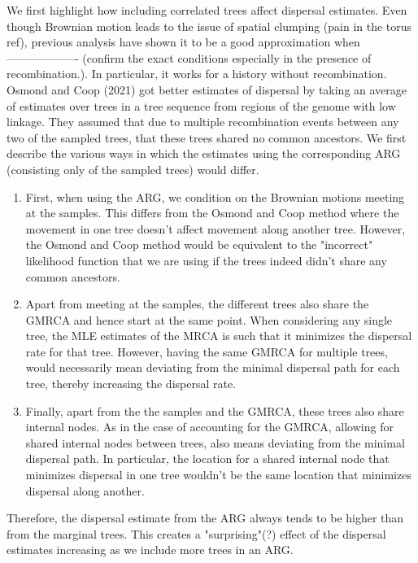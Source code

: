 We first highlight how including correlated trees affect dispersal estimates. Even though Brownian motion leads to the issue of spatial clumping (pain in the torus ref), previous analysis have shown it to be a good approximation when ------------------- (confirm the exact conditions especially in the presence of recombination.). In particular, it works for a history without recombination. Osmond and Coop (2021) got better estimates of dispersal by taking an average of estimates over trees in a tree sequence from regions of the genome with low linkage. They assumed that due to multiple recombination events between any two of the sampled trees, that these trees shared no common ancestors. We first describe the various ways in which the estimates using the corresponding ARG (consisting only of the sampled trees) would differ. 
\begin{enumerate}
    \item First, when using the ARG, we condition on the Brownian motions meeting at the samples. This differs from the Osmond and Coop method where the movement in one tree doesn't affect movement along another tree. However, the Osmond and Coop method would be equivalent to the "incorrect" likelihood function that we are using if the trees indeed didn't share any common ancestors. 
    \item Apart from meeting at the samples, the different trees also share the GMRCA and hence start at the same point. When considering any single tree, the MLE estimates of the MRCA is such that it minimizes the dispersal rate for that tree. However, having the same GMRCA for multiple trees, would necessarily mean deviating from the minimal dispersal path for each tree, thereby increasing the dispersal rate. 
    \item Finally, apart from the the samples and the GMRCA, these trees also share internal nodes. As in the case of accounting for the GMRCA, allowing for shared internal nodes between trees, also means deviating from the minimal dispersal path. In particular, the location for a shared internal node that minimizes dispersal in one tree wouldn't be the same location that minimizes dispersal along another.
\end{enumerate}

Therefore, the dispersal estimate from the ARG always tends to be higher than from the marginal trees. This creates a "surprising"(?) effect of the dispersal estimates increasing as we include more trees in an ARG. 



